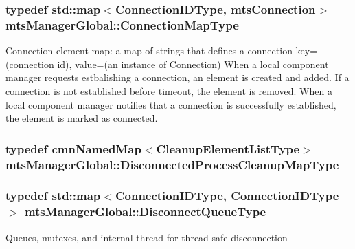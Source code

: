 \subsubsection[{Connection\+Map\+Type}]{\setlength{\rightskip}{0pt plus 5cm}typedef std\+::map$<${\bf Connection\+I\+D\+Type}, {\bf mts\+Connection}$>$ {\bf mts\+Manager\+Global\+::\+Connection\+Map\+Type}\hspace{0.3cm}{\ttfamily [protected]}}\label{classmts_manager_global_abee7afe21ca1987b873dbfdc3ac2fbfb}
Connection element map\+: a map of strings that defines a connection key=(connection id), value=(an instance of Connection) When a local component manager requests estbalishing a connection, an element is created and added. If a connection is not established before timeout, the element is removed. When a local component manager notifies that a connection is successfully established, the element is marked as connected. \hypertarget{classmts_manager_global_a9df2055466c1e6a041ae3abc266fe507}{}
\subsubsection[{Disconnected\+Process\+Cleanup\+Map\+Type}]{\setlength{\rightskip}{0pt plus 5cm}typedef {\bf cmn\+Named\+Map}$<${\bf Cleanup\+Element\+List\+Type}$>$ {\bf mts\+Manager\+Global\+::\+Disconnected\+Process\+Cleanup\+Map\+Type}\hspace{0.3cm}{\ttfamily [protected]}}\label{classmts_manager_global_a9df2055466c1e6a041ae3abc266fe507}
\hypertarget{classmts_manager_global_a2513c197a42becaff9d23272f4a7be4b}{}
\subsubsection[{Disconnect\+Queue\+Type}]{\setlength{\rightskip}{0pt plus 5cm}typedef std\+::map$<${\bf Connection\+I\+D\+Type}, {\bf Connection\+I\+D\+Type}$>$ {\bf mts\+Manager\+Global\+::\+Disconnect\+Queue\+Type}\hspace{0.3cm}{\ttfamily [protected]}}\label{classmts_manager_global_a2513c197a42becaff9d23272f4a7be4b}
Queues, mutexes, and internal thread for thread-\/safe disconnection \hypertarget{classmts_manager_global_a3449158e2432ced5a21d4853a2ca59b6}{}
